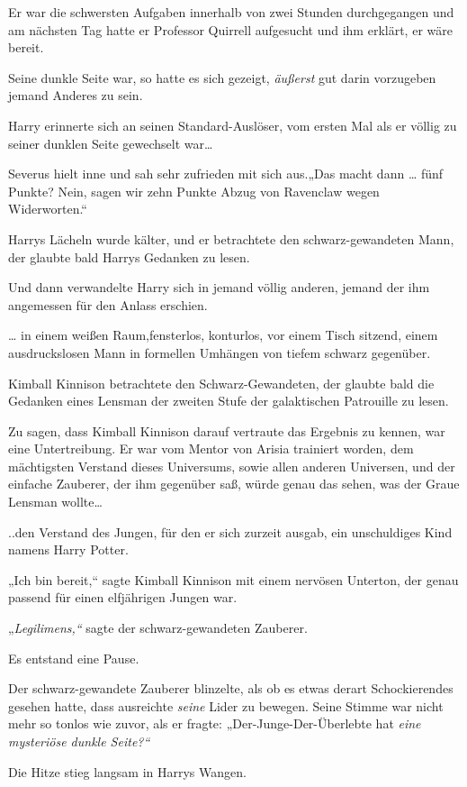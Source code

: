 {Er war die schwersten Aufgaben innerhalb von zwei Stunden durchgegangen und am nächsten Tag hatte er Professor Quirrell aufgesucht und ihm erklärt, er wäre bereit.

Seine dunkle Seite war, so hatte es sich gezeigt, \emph{äußerst} gut darin vorzugeben jemand Anderes zu sein.

Harry erinnerte sich an seinen Standard-Auslöser, vom ersten Mal als er völlig zu seiner dunklen Seite gewechselt war…

Severus hielt inne und sah sehr zufrieden mit sich aus.„Das macht dann … fünf Punkte? Nein, sagen wir zehn Punkte Abzug von Ravenclaw wegen Widerworten.“

Harrys Lächeln wurde kälter, und er betrachtete den schwarz-gewandeten Mann, der glaubte bald Harrys Gedanken zu lesen.

Und dann verwandelte Harry sich in jemand völlig anderen, jemand der ihm angemessen für den Anlass erschien.

… in einem weißen Raum,fensterlos, konturlos, vor einem Tisch sitzend, einem ausdruckslosen Mann in formellen Umhängen von tiefem schwarz gegenüber.

Kimball Kinnison betrachtete den Schwarz-Gewandeten, der glaubte bald die Gedanken eines Lensman der zweiten Stufe der galaktischen Patrouille zu lesen.

Zu sagen, dass Kimball Kinnison darauf vertraute das Ergebnis zu kennen, war eine Untertreibung. Er war vom Mentor von Arisia trainiert worden, dem mächtigsten Verstand dieses Universums, sowie allen anderen Universen, und der einfache Zauberer, der ihm gegenüber saß, würde genau das sehen, was der Graue Lensman wollte…

..den Verstand des Jungen, für den er sich zurzeit ausgab, ein unschuldiges Kind namens Harry Potter.

„Ich bin bereit,“ sagte Kimball Kinnison mit einem nervösen Unterton, der genau passend für einen elfjährigen Jungen war.

„\emph{Legilimens,“} sagte der schwarz-gewandeten Zauberer.

Es entstand eine Pause.

Der schwarz-gewandete Zauberer blinzelte, als ob es etwas derart Schockierendes gesehen hatte, dass ausreichte \emph{seine} Lider zu bewegen. Seine Stimme war nicht mehr so tonlos wie zuvor, als er fragte: „Der-Junge-Der-Überlebte hat \emph{eine mysteriöse dunkle Seite?“}

Die Hitze stieg langsam in Harrys Wangen.

}
